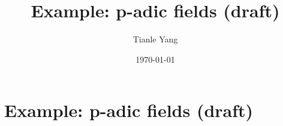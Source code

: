 \documentclass{noteformyself}
\title{Example: p-adic fields (draft)}
\author{Tianle Yang}
\date{\today}
\begin{document}
    \maketitle

    \section{Example: p-adic fields (draft)}



\end{document}

